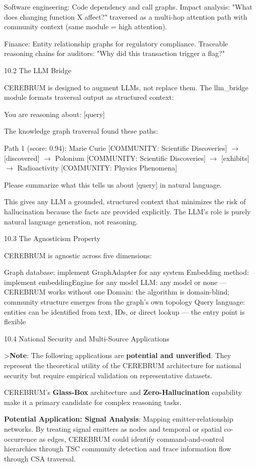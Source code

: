 \documentclass[10pt,journal,compsoc]{IEEEtran}
\begin{document}
Software engineering: Code dependency and call graphs. Impact analysis:
"What does changing function X affect?" traversed as a multi-hop attention path with community context (same module = high attention).

Finance: Entity relat\-ionship graphs for regulatory compliance. Traceable reasoning chains for auditors: "Why did this transaction trigger a flag?"

10.2 The LLM Bridge

CEREBRUM is designed to augment LLMs, not replace them. The llm\_bridge module formats traversal output as structured context:

You are reasoning about: [query]

The knowledge graph traversal found these paths:

Path 1 (score: 0.94):
  Marie Curie [COMMUNITY: Scientific Discoveries]
  $\to$ [discovered] $\to$
  Polonium [COMMUNITY: Scientific Discoveries]
  $\to$ [exhibits] $\to$
  Radioa\-ctivity [COMMUNITY: Physics Phenomena]

Please summarize what this tells us about [query] in natural language.

This gives any LLM a grounded, structured context that minimizes the risk of hallu\-cination because the facts are provided explicitly. The LLM's role is purely natural language generation, not reasoning.

10.3 The Agnosticism Property

CEREBRUM is agnostic across five dimensions:

Graph database: implement GraphAdapter for any system
Embedding method: implement embeddingEngine for any model
LLM: any model or none — CEREBRUM works without one
Domain: the algorithm is domain-blind; community structure emerges from the graph's own topology
Query language: entities can be identified from text, IDs, or direct lookup — the entry point is flexible

10.4 National Security and Multi-Source Applic\-ations

\textgreater  \textbf{Note}: The following appli\-cations are \textbf{potential and unverified}. They represent the theoretical utility of the CEREBRUM archi\-tecture for national security but require empirical validation on repre\-sentative datasets.

CEREBRUM's \textbf{Glass-Box} archi\-tecture and \textbf{Zero-Halluc\-ination} capability make it a primary candidate for complex reasoning tasks.

\textbf{Potential Application: Signal Analysis}: Mapping emitter-relat\-ionship networks. By treating signal emitters as nodes and temporal or spatial co-occurrence as edges, CEREBRUM could identify command-and-control hierarchies through TSC community detection and trace information flow through CSA traversal.
\end{document}
